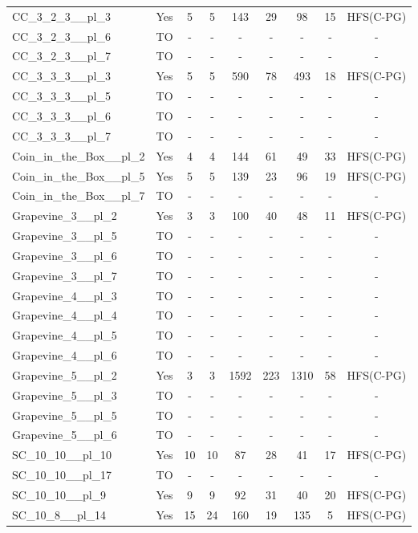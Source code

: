 \documentclass{article}
\begin{document}
\begin{tabular}{lcccccccc}
CC\_3\_2\_3\_\_pl\_3 & Yes & 5 & 5 & 143 & 29 & 98 & 15 & HFS(C-PG) \\
CC\_3\_2\_3\_\_pl\_6 & TO & - & - & - & - & - & - & - \\
CC\_3\_2\_3\_\_pl\_7 & TO & - & - & - & - & - & - & - \\
CC\_3\_3\_3\_\_pl\_3 & Yes & 5 & 5 & 590 & 78 & 493 & 18 & HFS(C-PG) \\
CC\_3\_3\_3\_\_pl\_5 & TO & - & - & - & - & - & - & - \\
CC\_3\_3\_3\_\_pl\_6 & TO & - & - & - & - & - & - & - \\
CC\_3\_3\_3\_\_pl\_7 & TO & - & - & - & - & - & - & - \\
Coin\_in\_the\_Box\_\_pl\_2 & Yes & 4 & 4 & 144 & 61 & 49 & 33 & HFS(C-PG) \\
Coin\_in\_the\_Box\_\_pl\_5 & Yes & 5 & 5 & 139 & 23 & 96 & 19 & HFS(C-PG) \\
Coin\_in\_the\_Box\_\_pl\_7 & TO & - & - & - & - & - & - & - \\
Grapevine\_3\_\_pl\_2 & Yes & 3 & 3 & 100 & 40 & 48 & 11 & HFS(C-PG) \\
Grapevine\_3\_\_pl\_5 & TO & - & - & - & - & - & - & - \\
Grapevine\_3\_\_pl\_6 & TO & - & - & - & - & - & - & - \\
Grapevine\_3\_\_pl\_7 & TO & - & - & - & - & - & - & - \\
Grapevine\_4\_\_pl\_3 & TO & - & - & - & - & - & - & - \\
Grapevine\_4\_\_pl\_4 & TO & - & - & - & - & - & - & - \\
Grapevine\_4\_\_pl\_5 & TO & - & - & - & - & - & - & - \\
Grapevine\_4\_\_pl\_6 & TO & - & - & - & - & - & - & - \\
Grapevine\_5\_\_pl\_2 & Yes & 3 & 3 & 1592 & 223 & 1310 & 58 & HFS(C-PG) \\
Grapevine\_5\_\_pl\_3 & TO & - & - & - & - & - & - & - \\
Grapevine\_5\_\_pl\_5 & TO & - & - & - & - & - & - & - \\
Grapevine\_5\_\_pl\_6 & TO & - & - & - & - & - & - & - \\
SC\_10\_10\_\_pl\_10 & Yes & 10 & 10 & 87 & 28 & 41 & 17 & HFS(C-PG) \\
SC\_10\_10\_\_pl\_17 & TO & - & - & - & - & - & - & - \\
SC\_10\_10\_\_pl\_9 & Yes & 9 & 9 & 92 & 31 & 40 & 20 & HFS(C-PG) \\
SC\_10\_8\_\_pl\_14 & Yes & 15 & 24 & 160 & 19 & 135 & 5 & HFS(C-PG) \\

\end{tabular}
\end{document}

